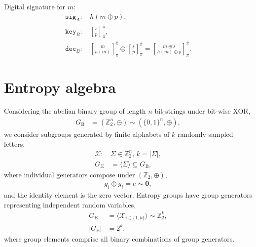 \documentclass[twocolumn, aps, amsmath, amssymb, nofootinbib, superscriptaddress, longbibliography, doublefloatfix, table-of-contents, eqsecnum, rmp]{revtex4-2}
\def\zerovec{\mathbf{0}}
\newcommand{\stackbraid}[2]{{\genfrac{[}{]}{0pt}{}{{#1}}{{#2}}}^{\bar{\pi}}_{\pi}}
\begin{document}
Digital signature for $m$:
\begin{align}
	\mathtt{sig}_A:\, &h(m \oplus p),\nonumber\\
	\mathtt{key}_B:\, &\stackbraid{s}{p},\nonumber\\
	\mathtt{dec}_B:\, &\stackbraid{m}{h(m)}\oplus \stackbraid{s}{p} = \stackbraid{m\oplus s}{h(m)\oplus p}.
\end{align}


%

\section{Entropy algebra}

Considering the abelian binary group of length $n$ bit-strings under bit-wise XOR,
\begin{align}
	G_\mathrm{B} &= (\mathbb{Z}_2^n,\oplus) \sim  (\{0,1\}^n,\oplus),
\end{align}
we consider subgroups generated by finite alphabets of $k$ randomly sampled letters,
\begin{align}
	\mathcal{X}:\, &\Sigma \in \mathbb{Z}_2^n,\, k = |\Sigma|,\nonumber\\
	G_\Sigma &= \langle \Sigma \rangle \subseteq G_\mathrm{B},
\end{align}
where individual generators compose under $(\mathbb{Z}_2,\oplus)$,
\begin{align}
	g_i\oplus g_i = e \sim \zerovec,
\end{align}
and the identity element is the zero vector. Entropy groups have group generators representing independent random variables,
\begin{align}
	G_\mathrm{E} &= \langle \mathcal{X}_{i\in\{1,k\}} \rangle \sim \mathbb{Z}_2^k,\nonumber\\
	|G_\mathrm{E}| &= 2^k,
\end{align}
where group elements comprise all binary combinations of group generators.
\end{document}
